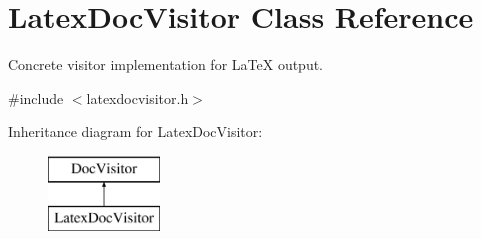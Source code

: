 \hypertarget{class_latex_doc_visitor}{}\section{Latex\+Doc\+Visitor Class Reference}
\label{class_latex_doc_visitor}


Concrete visitor implementation for La\+TeX output.  




{\ttfamily \#include $<$latexdocvisitor.\+h$>$}

Inheritance diagram for Latex\+Doc\+Visitor\+:\begin{figure}[H]
\begin{center}
\leavevmode
\includegraphics[height=2.000000cm]{class_latex_doc_visitor}
\end{center}
\end{figure}
